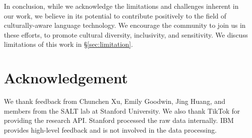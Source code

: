 \documentclass{article} %
\begin{document}


In conclusion, while we acknowledge the limitations and challenges inherent in our work, we believe in its potential to contribute positively to the field of culturally-aware language technology. We encourage the community to join us in these efforts, to promote cultural diversity, inclusivity, and sensitivity. We discuss limitations of this work in \S\ref{sec:limitation}. 








\section*{Acknowledgement}
We thank feedback from Chunchen Xu, Emily Goodwin, Jing Huang,  and members from the SALT lab at Stanford University. We also thank TikTok for providing the research API. Stanford processed the raw data internally. IBM provides high-level feedback and is not involved in the data processing.
\end{document}
